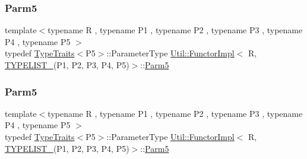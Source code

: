\mbox{\label{classUtil_1_1FunctorImpl_3_01R_00_01TYPELIST__5_07P1_00_01P2_00_01P3_00_01P4_00_01P5_08_4_a465c4b811dcbcfecb64048b28429c6ab}} 
\subsubsection{\texorpdfstring{Parm5}{Parm5}\hspace{0.1cm}{\footnotesize\ttfamily [1/3]}}
{\footnotesize\ttfamily template$<$typename R , typename P1 , typename P2 , typename P3 , typename P4 , typename P5 $>$ \\
typedef \mbox{\hyperlink{classUtil_1_1TypeTraits}{Type\+Traits}}$<$P5$>$\+::Parameter\+Type \mbox{\hyperlink{classUtil_1_1FunctorImpl}{Util\+::\+Functor\+Impl}}$<$ R, \mbox{\hyperlink{adat__devel__install_2include_2adat_2typelist_8h_aad5d9b3c82c8503c85c625acd41c0a2f}{T\+Y\+P\+E\+L\+I\+S\+T\+\_}}(P1, P2, P3, P4, P5)$>$\+::\mbox{\hyperlink{structUtil_1_1Private_1_1FunctorImplBase_ac5b1d132e854e4f9fd6fb1e43313fa26}{Parm5}}}

\mbox{\label{classUtil_1_1FunctorImpl_3_01R_00_01TYPELIST__5_07P1_00_01P2_00_01P3_00_01P4_00_01P5_08_4_a465c4b811dcbcfecb64048b28429c6ab}} 
\subsubsection{\texorpdfstring{Parm5}{Parm5}\hspace{0.1cm}{\footnotesize\ttfamily [2/3]}}
{\footnotesize\ttfamily template$<$typename R , typename P1 , typename P2 , typename P3 , typename P4 , typename P5 $>$ \\
typedef \mbox{\hyperlink{classUtil_1_1TypeTraits}{Type\+Traits}}$<$P5$>$\+::Parameter\+Type \mbox{\hyperlink{classUtil_1_1FunctorImpl}{Util\+::\+Functor\+Impl}}$<$ R, \mbox{\hyperlink{adat__devel__install_2include_2adat_2typelist_8h_aad5d9b3c82c8503c85c625acd41c0a2f}{T\+Y\+P\+E\+L\+I\+S\+T\+\_}}(P1, P2, P3, P4, P5)$>$\+::\mbox{\hyperlink{structUtil_1_1Private_1_1FunctorImplBase_ac5b1d132e854e4f9fd6fb1e43313fa26}{Parm5}}}

